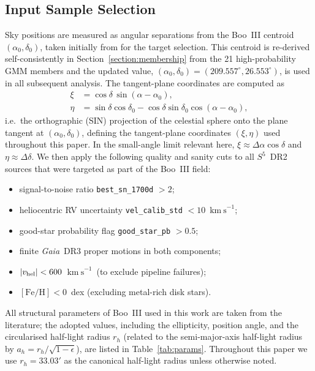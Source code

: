 \documentclass[twocolumn, apj, numberedappendix, appendixfloats]{openjournal_dhayaa}
\newcommand{\SSSSS}{${S}^5$\xspace}
\newcommand{\gaia}{\textit{Gaia}\xspace}
\newcommand{\vlosUnits}{$\mathrm{km~s}^{-1}$\xspace}
\begin{document}
\subsection{Input Sample Selection} \label{section:input_sample} 
Sky positions are measured as angular separations from the Boo~III centroid $(\alpha_0,\delta_0)$, taken initially from \citet{Grillmair2009} for the target selection.  This centroid is re-derived self-consistently in Section~\ref{section:membership} from the 21 high-probability GMM members and the updated value, $(\alpha_0,\delta_0) = (209.557^\circ, 26.553^\circ)$, is used in all subsequent analysis.  The tangent-plane coordinates are computed as
\begin{align}
\xi  &= \cos\delta\,\sin(\alpha-\alpha_0), \\
\eta &= \sin\delta\cos\delta_0 - \cos\delta\sin\delta_0\cos(\alpha-\alpha_0),
\end{align}
i.e.\ the orthographic (SIN) projection of the celestial sphere onto the plane tangent at $(\alpha_0,\delta_0)$, defining the tangent-plane coordinates $(\xi, \eta)$ used throughout this paper.  In the small-angle limit relevant here, $\xi \approx \Delta\alpha\cos\delta$ and $\eta \approx \Delta\delta$.
We then apply the following quality and sanity cuts to all \SSSSS\ DR2 sources that were targeted as part of the Boo~III field:
\begin{itemize}[itemsep=0pt]
    \item signal-to-noise ratio \texttt{best\_sn\_1700d} $> 2$;
    \item heliocentric RV uncertainty \texttt{vel\_calib\_std} $< 10$~\vlosUnits;
    \item good-star probability flag \texttt{good\_star\_pb} $> 0.5$;
    \item finite \gaia\ DR3 proper motions in both components;
    \item $|v_{\rm hel}| < 600$~\vlosUnits\ (to exclude pipeline failures);
    \item $[\mathrm{Fe/H}] < 0$~dex (excluding metal-rich disk stars).
\end{itemize}
All structural parameters of Boo~III used in this work are taken from the literature; the adopted values, including the ellipticity, position angle, and the circularised half-light radius $r_h$ (related to the semi-major-axis half-light radius by $a_h = r_h / \sqrt{1-\epsilon}$), are listed in Table~\ref{tab:params}. Throughout this paper we use $r_h = 33.03'$ \citep{Moskowitz2020} as the canonical half-light radius unless otherwise noted.
\end{document}
